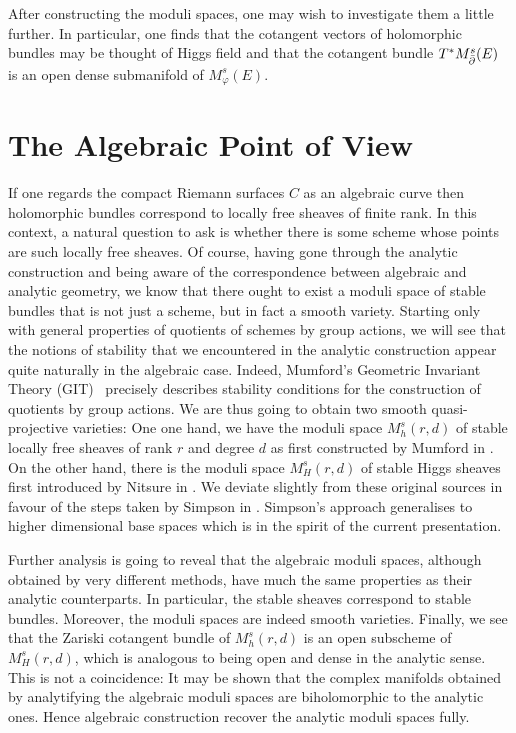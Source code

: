 \documentclass[12pt]{ociamthesis}  %
\begin{document}
After constructing the moduli spaces, one may wish to investigate
them a little further. In particular, one finds that the cotangent
vectors of holomorphic bundles may be thought of Higgs field and that
the cotangent bundle $T^* M^s_{\bar{\partial}}(E)$ is an open dense submanifold
of $M^s_\varphi(E)$.

\section{The Algebraic Point of View}

If one regards the compact Riemann surfaces $C$ as an algebraic curve
then holomorphic bundles correspond to locally free sheaves of finite
rank. In this context, a natural question to ask is whether there is
some scheme whose points are such locally free sheaves. Of course,
having gone through the analytic construction and being aware of
the correspondence between algebraic and analytic geometry, we know
that there ought to exist a moduli space of stable bundles that is not
just a scheme, but in fact a smooth variety. Starting only with
general properties of quotients of schemes by group actions, we will
see that the notions of stability that we encountered in the analytic
construction appear quite naturally in the algebraic case. Indeed,
Mumford's Geometric Invariant Theory (GIT)~\cite{mumford1994}
precisely describes stability conditions for the construction of quotients
by group actions.
We are thus going to obtain two smooth quasi-projective varieties:
One one hand, we have the moduli space $M^s_h(r,d)$ of stable locally free sheaves of
rank $r$ and degree $d$ as first constructed by Mumford in
\cite{mumford1963}. On the other hand, there is the moduli space
$M^s_H(r,d)$ of stable Higgs sheaves first introduced by Nitsure in
\cite{nitsure1991}. We deviate slightly from these original sources
in favour of the steps taken by Simpson in \cite{simpson1994}. Simpson's
approach generalises to higher dimensional base spaces which is in the
spirit of the current presentation.

Further analysis is going to reveal that the algebraic moduli spaces,
although obtained by very different methods, have much the same
properties as their analytic counterparts. In particular, the stable
sheaves correspond to stable bundles. Moreover, the moduli spaces
are indeed smooth varieties. Finally, we see that the Zariski cotangent
bundle of $M^s_h(r,d)$ is an open subscheme of $M^s_H(r,d)$, which
is analogous to being open and dense in the analytic sense. This is
not a coincidence: It may be shown that the complex manifolds obtained
by analytifying the algebraic moduli spaces are biholomorphic to
the analytic ones. Hence algebraic construction recover the analytic
moduli spaces fully.
\end{document}
